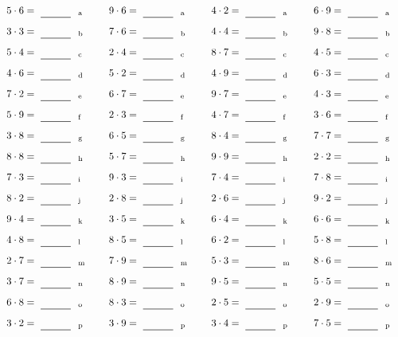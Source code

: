 \documentclass
[
  draft    = true,
  fontsize = 11pt,
  parskip  = half-
]
{scrartcl}
\begin{document}
\par\vfill\par
\begin{align*}
    \pline{5\cdot6}&=\rline{a}
  & \pline{9\cdot6}&=\rline{a}
  & \pline{4\cdot2}&=\rline{a}
  & \pline{6\cdot9}&=\rline{a} \\[1ex]
    \pline{3\cdot3}&=\rline{b}
  & \pline{7\cdot6}&=\rline{b}
  & \pline{4\cdot4}&=\rline{b}
  & \pline{9\cdot8}&=\rline{b} \\[1ex]
    \pline{5\cdot4}&=\rline{c}
  & \pline{2\cdot4}&=\rline{c}
  & \pline{8\cdot7}&=\rline{c}
  & \pline{4\cdot5}&=\rline{c} \\[1ex]
    \pline{4\cdot6}&=\rline{d}
  & \pline{5\cdot2}&=\rline{d}
  & \pline{4\cdot9}&=\rline{d}
  & \pline{6\cdot3}&=\rline{d} \\[1ex]
    \pline{7\cdot2}&=\rline{e}
  & \pline{6\cdot7}&=\rline{e}
  & \pline{9\cdot7}&=\rline{e}
  & \pline{4\cdot3}&=\rline{e} \\[1ex]
    \pline{5\cdot9}&=\rline{f}
  & \pline{2\cdot3}&=\rline{f}
  & \pline{4\cdot7}&=\rline{f}
  & \pline{3\cdot6}&=\rline{f} \\[1ex]
    \pline{3\cdot8}&=\rline{g}
  & \pline{6\cdot5}&=\rline{g}
  & \pline{8\cdot4}&=\rline{g}
  & \pline{7\cdot7}&=\rline{g} \\[1ex]
    \pline{8\cdot8}&=\rline{h}
  & \pline{5\cdot7}&=\rline{h}
  & \pline{9\cdot9}&=\rline{h}
  & \pline{2\cdot2}&=\rline{h} \\[1ex]
    \pline{7\cdot3}&=\rline{i}
  & \pline{9\cdot3}&=\rline{i}
  & \pline{7\cdot4}&=\rline{i}
  & \pline{7\cdot8}&=\rline{i} \\[1ex]
    \pline{8\cdot2}&=\rline{j}
  & \pline{2\cdot8}&=\rline{j}
  & \pline{2\cdot6}&=\rline{j}
  & \pline{9\cdot2}&=\rline{j} \\[1ex]
    \pline{9\cdot4}&=\rline{k}
  & \pline{3\cdot5}&=\rline{k}
  & \pline{6\cdot4}&=\rline{k}
  & \pline{6\cdot6}&=\rline{k} \\[1ex]
    \pline{4\cdot8}&=\rline{l}
  & \pline{8\cdot5}&=\rline{l}
  & \pline{6\cdot2}&=\rline{l}
  & \pline{5\cdot8}&=\rline{l} \\[1ex]
    \pline{2\cdot7}&=\rline{m}
  & \pline{7\cdot9}&=\rline{m}
  & \pline{5\cdot3}&=\rline{m}
  & \pline{8\cdot6}&=\rline{m} \\[1ex]
    \pline{3\cdot7}&=\rline{n}
  & \pline{8\cdot9}&=\rline{n}
  & \pline{9\cdot5}&=\rline{n}
  & \pline{5\cdot5}&=\rline{n} \\[1ex]
    \pline{6\cdot8}&=\rline{o}
  & \pline{8\cdot3}&=\rline{o}
  & \pline{2\cdot5}&=\rline{o}
  & \pline{2\cdot9}&=\rline{o} \\[1ex]
    \pline{3\cdot2}&=\rline{p}
  & \pline{3\cdot9}&=\rline{p}
  & \pline{3\cdot4}&=\rline{p}
  & \pline{7\cdot5}&=\rline{p}
\end{align*}
\end{document}
